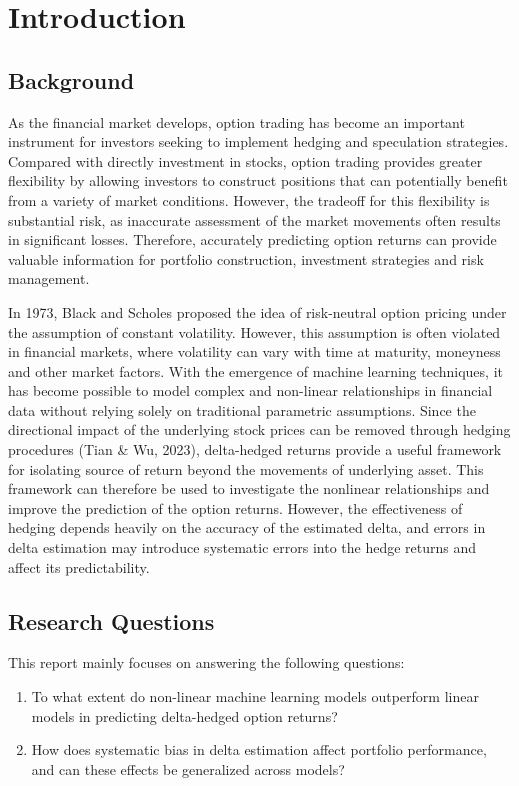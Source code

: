 \documentclass[oneside, 12pt]{article}
\newcommand*{\1}{\text{\scalebox{1.1}{\usefont{U}{bbold}{m}{n}1}}}
\begin{document}
\section{Introduction}
\subsection{Background}
As the financial market develops, option trading has become an important instrument for investors seeking to implement hedging and speculation strategies. Compared with directly investment in stocks, option trading provides greater flexibility by allowing investors to construct positions that can potentially benefit from a variety of market conditions. However, the tradeoff for this flexibility is substantial risk, as inaccurate assessment of the market movements often results in significant losses. Therefore, accurately predicting option returns can provide valuable information for portfolio construction, investment strategies and risk management.  \newline

In 1973, Black and Scholes proposed the idea of risk-neutral option pricing under the assumption of constant volatility. However, this assumption is often violated in financial markets, where volatility can vary with time at maturity, moneyness and other market factors. With the emergence of machine learning techniques, it has become possible to model complex and non-linear relationships in financial data without relying solely on traditional parametric assumptions. Since the directional impact of the underlying stock prices can be removed through hedging procedures (Tian \& Wu, 2023), delta-hedged returns provide a useful framework for isolating source of return beyond the movements of underlying asset. This framework can therefore be used to investigate the nonlinear relationships and improve the prediction of the option returns. However, the effectiveness of hedging depends heavily on the accuracy of the estimated delta, and errors in delta estimation may introduce systematic errors into the hedge returns and affect its predictability. 
\subsection{Research Questions}
This report mainly focuses on answering the following questions:
\begin{enumerate}
\item To what extent do non-linear machine learning models outperform linear models in predicting delta-hedged option returns?
\item How does systematic bias in delta estimation affect portfolio performance, and can these effects be generalized across models?
\end{enumerate}
\newpage
\end{document}
